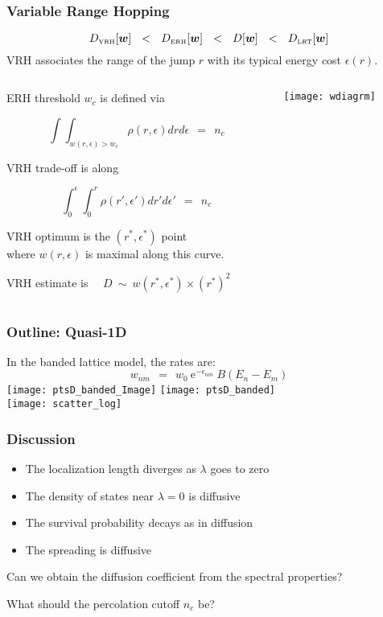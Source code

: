 \documentclass{beamer}
\newcommand{\eexp}{\mbox{e}^}
\newcommand{\tbox}[1]{\mbox{\tiny #1}}
\begin{document}
\begin{frame}
\frametitle{Variable Range Hopping}

%
\[
D_{\tbox{VRH}}[\bm{w}]  
\ \ < \ \ D_{\tbox{ERH}}[\bm{w}]
\ \ < \ \ D[\bm{w}]
\ \ < \ \ D_{\tbox{LRT}}[\bm{w}]
\]
%
VRH associates the range of the jump $r$ with its typical 
energy cost $\epsilon(r)$. 
%

\begin{columns}
\begin{column}{0.6\textwidth}
ERH threshold $w_c$ is defined via 

\[
\int\!\!\int_{w(r,\epsilon)>w_c} \rho(r,\epsilon)drd\epsilon \ \ = \ \ n_c
\]




VRH trade-off is along 

\[
\int_0^{\epsilon} \int_0^{r} \rho(r',\epsilon')  dr'd\epsilon' \ \ = \ \ n_c 
\]




VRH optimum is the $(r^*,\epsilon^*)$ point \\
where $w(r,\epsilon)$ is maximal along this curve. 



{VRH estimate} is \ \ $D \ \sim \ w(r^*,\epsilon^*) \times (r^*)^2$

\end{column}
\begin{column}{0.4\textwidth}
\texttt{[image: wdiagrm]}
\end{column}
\end{columns}
\end{frame}

\begin{frame}
\frametitle{Outline: Quasi-1D}
In the banded lattice model, the rates are:
\[  w_{nm} \ \ = \ \ w_0 \ \eexp{-\epsilon_{nm}} \ B\left(E_n-E_m\right)\]
\texttt{[image: ptsD\_banded\_Image]}
\texttt{[image: ptsD\_banded]}\\
\texttt{[image: scatter\_log]}
\end{frame}

\begin{frame}
\frametitle{Discussion}
\begin{itemize}
  \item The localization length diverges as $\lambda$ goes to zero
  \item The density of states near $\lambda=0$ is diffusive
  \item The survival probability decays as in diffusion
  \item The spreading is diffusive
\end{itemize}
\vspace{20pt}
Can we obtain the diffusion coefficient from the spectral properties?

\vspace{20pt}
What should the percolation cutoff $n_c$ be?
\end{frame}
\end{document}
